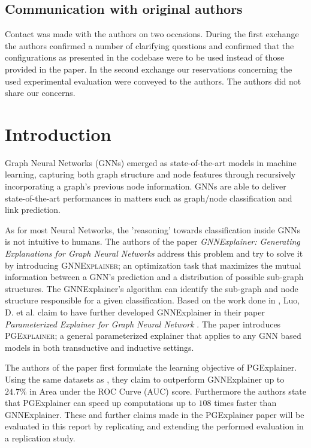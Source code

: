 \subsection*{Communication with original authors}
Contact was made with the authors on two occasions. During the first exchange the authors confirmed a number of clarifying questions and confirmed that the configurations as presented in the codebase were to be used instead of those provided in the paper. In the second exchange our reservations concerning the used experimental evaluation were conveyed to the authors. The authors did not share our concerns. 

\section{Introduction}
Graph Neural Networks (GNNs) emerged as state-of-the-art models in machine learning, capturing both graph structure and node features through recursively incorporating a graph's previous node information. GNNs are able to deliver state-of-the-art performances in matters such as graph/node classification and link prediction.

As for most Neural Networks, the 'reasoning' towards classification inside GNNs is not intuitive to humans. The authors of the paper \textit{GNNExplainer: Generating Explanations for Graph Neural Networks} \cite{ying2019gnnexplainer} address this problem and try to solve it by introducing \textsc{GNNExplainer}; an optimization task that maximizes the mutual information between a GNN's prediction and a distribution of possible sub-graph structures. The GNNExplainer's algorithm can identify the sub-graph and node structure responsible for a given classification.
Based on the work done in \cite{ying2019gnnexplainer}, Luo, D. et al. claim to have further developed GNNExplainer in their paper \textit{Parameterized Explainer for Graph Neural Network} \cite{luo2020parameterized}. The paper introduces \textsc{PGExplainer}; a general parameterized explainer that applies to any GNN based models in both transductive and inductive settings. 

The authors of the paper first formulate the learning objective of PGExplainer. Using the same datasets as \cite{ying2019gnnexplainer}, they claim to outperform GNNExplainer up to $24.7\%$ in Area under the ROC Curve (AUC) \cite{Hanley1982roc-auc} score. Furthermore the authors state that PGExplainer can speed up computations up to $108$ times faster than GNNExplainer. These and further claims made in the PGExplainer paper will be evaluated in this report by replicating and extending the performed evaluation in a replication study.

